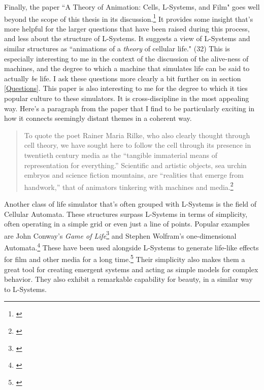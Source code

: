 \documentclass[12pt,twoside]{reedthesis}
\begin{document}
	Finally, the paper ``A Theory of Animation: Cells, L-Systems, and Film" goes well beyond the scope of this thesis in its discussion.\footnote{\cite{theory2004}} It provides some insight that's more helpful for the larger questions that have been raised during this process, and less about the structure of L-Systems. It suggests a view of L-Systems and similar structures as ``animations of a \textit{theory} of cellular life." (32) This is especially interesting to me in the context of the discussion of the alive-ness of machines, and the degree to which a machine that simulates life can be said to actually \textit{be} life. I ask these questions more clearly a bit further on in section \ref{Questions}. This paper is also interesting to me for the degree to which it ties popular culture to these simulators. It is cross-discipline in the most appealing way. Here's a paragraph from the paper that I find to be particularly exciting in how it connects seemingly distant themes in a coherent way.
	
	\begin{quote}
	To quote the poet Rainer Maria Rilke, who also clearly thought through cell theory, we have sought here to follow the cell through its presence in twentieth century media as the “tangible immaterial means of representation for everything.” Scientific and artistic objects, sea urchin embryos and science fiction mountains, are “realities that emerge from handwork,” that of animators tinkering with machines and media.\footnote{\cite{theory2004}}
	\end{quote}
	
	
	Another class of life simulator that's often grouped with L-Systems is the field of Cellular Automata. These structures surpass L-Systems in terms of simplicity, often operating in a simple grid or even just a line of points. Popular examples are John Conway's \textit{Game of Life}\footnote{\cite{GameOfLife1970}} and Stephen Wolfram's one-dimensional Automata.\footnote{\cite{wolfram2002}} These have been used alongside L-Systems to generate life-like effects for film and other media for a long time.\footnote{\cite{theory2004}} Their simplicity also makes them a great tool for creating emergent systems and acting as simple models for complex behavior. They also exhibit a remarkable capability for beauty, in a similar way to L-Systems.
	
\end{document}
